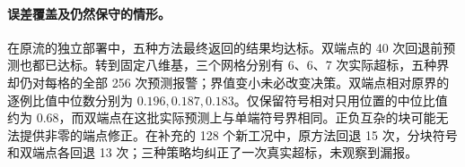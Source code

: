 \paragraph{误差覆盖及仍然保守的情形。}
在原流的独立部署中，五种方法最终返回的结果均达标。双端点的 40 次回退前预测也都已达标。转到固定八维基，三个网格分别有 6、6、7 次实际超标，五种界却仍对每格的全部 256 次预测报警；界值变小未必改变决策。双端点相对原界的逐例比值中位数分别为 $0.196,0.187,0.183$。仅保留符号相对只用位置的中位比值约为 $0.68$，而双端点在这批实际预测上与单端符号界相同。正负互杂的块可能无法提供非零的端点修正。在补充的 128 个新工况中，原方法回退 15 次，分块符号和双端点各回退 13 次；三种策略均纠正了一次真实超标，未观察到漏报。
